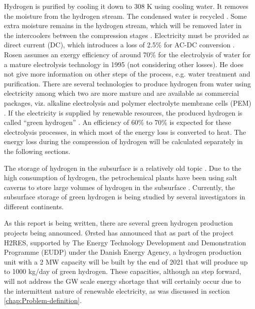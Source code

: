 \documentclass{ECOS_2021}
\begin{document}
Hydrogen is purified by cooling it down to 308 K using cooling water.
It removes the moisture from the hydrogen stream. The condensed water
is recycled \cite{rosenEnergyExergyAnalyses1995}. Some extra moisture
remains in the hydrogen stream, which will be removed later in the
intercoolers between the compression stages \cite{rosenEnergyExergyAnalyses1995}.
Electricity must be provided as direct current (DC), which introduces
a loss of 2.5\% for AC-DC conversion \cite{rosenEnergyExergyAnalyses1995}.
Rosen assumes an exergy efficiency of around 70\% for the electrolysis
of water for a mature electrolysis technology in 1995 (not considering
other losses). He does not give more information on other steps of
the process, e.g. water treatment and purification. There are several
technologies to produce hydrogen from water using electricity among
which two are more mature and are available as commercial packages,
viz. alkaline electrolysis \cite{braunsAlkalineWaterElectrolysis2020}
and polymer electrolyte membrane cells (PEM) \cite{babicCriticalReviewIdentifying2017}.
If the electricity is supplied by renewable resources, the produced
hydrogen is called \textquotedblleft green hydrogen\textquotedblright{}
\cite{granovskiiExergeticLifeCycle2007}. An efficiency of 60\% to
70\% is expected for these electrolysis processes, in which most of
the energy loss is converted to heat. The energy loss during the compression
of hydrogen will be calculated separately in the following sections.

The storage of hydrogen in the subsurface is a relatively old topic
\cite{ozarslanLargescaleHydrogenEnergy2012,zivarUndergroundHydrogenStorage2020}.
Due to the high consumption of hydrogen, the petrochemical plants
have been using salt caverns to store large volumes of hydrogen in
the subsurface \cite{ozarslanLargescaleHydrogenEnergy2012}. Currently,
the subsurface storage of green hydrogen is being studied by several
investigators in different continents.

As this report is being written, there are several green hydrogen
production projects being announced. Ørsted has announced that as
part of the project H2RES, supported by The Energy Technology Development
and Demonstration Programme (EUDP) under the Danish Energy Agency,
a hydrogen production unit with a 2 MW capacity will be built by the
end of 2021 \cite{OrstedTakesFinal} that will produce up to 1000
kg/day of green hydrogen. These capacities, although an step forward,
will not address the GW scale energy shortage that will certainly
occur due to the intermittent nature of renewable electricity, as
was discussed in section \ref{chap:Problem-definition}. 
\end{document}
